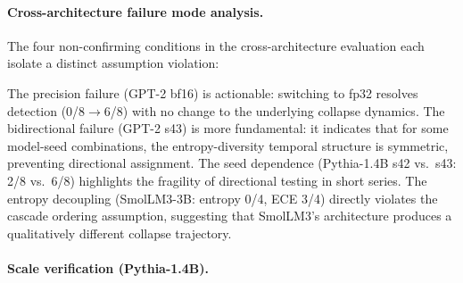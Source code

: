 \paragraph{Cross-architecture failure mode analysis.}
The four non-confirming conditions in the cross-architecture evaluation each isolate a distinct assumption violation:

\begin{table}[H]
\centering
\small
\caption{Failure mode taxonomy for non-confirming cross-architecture conditions ($\alpha{=}1.0$).}
\label{tab:failure_modes}
\end{table}

The precision failure (GPT-2 bf16) is actionable: switching to fp32 resolves detection (0/8$\to$6/8) with no change to the underlying collapse dynamics.
The bidirectional failure (GPT-2 s43) is more fundamental: it indicates that for some model-seed combinations, the entropy-diversity temporal structure is symmetric, preventing directional assignment.
The seed dependence (Pythia-1.4B s42 vs.\ s43: 2/8 vs.\ 6/8) highlights the fragility of directional testing in short series.
The entropy decoupling (SmolLM3-3B: entropy 0/4, ECE 3/4) directly violates the cascade ordering assumption, suggesting that SmolLM3's architecture produces a qualitatively different collapse trajectory.

\paragraph{Scale verification (Pythia-1.4B).}
\label{app:scale_14b}


